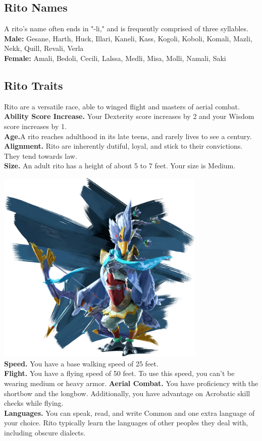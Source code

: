 \documentclass[10pt,twoside,twocolumn,openany]{book}
\begin{document}
\subsection{Rito Names}
A rito's name often ends in "-li," and is frequently comprised of three syllables.\\
\textbf{Male:} Gesane, Harth, Huck, Illari, Kaneli, Kass, Kogoli, Koboli, Komali, Mazli, Nekk, Quill, Revali, Verla\\
\textbf{Female:} Amali, Bedoli, Cecili, Lalssa, Medli, Misa, Molli, Namali, Saki

\subsection{Rito Traits}
Rito are a versatile race, able to winged flight and masters of aerial combat.\\
\indent \textbf{Ability Score Increase.} Your Dexterity score increases by 2 and your Wisdom score increases by 1.\\
\indent \textbf{Age.}A rito reaches adulthood in its late teens, and rarely lives to see a century.\\
\indent \textbf{Alignment.} Rito are inherently dutiful, loyal, and stick to their convictions. They tend towards law. \\
\indent \textbf{Size.} An adult rito has a height of about 5 to 7 feet. Your size is Medium.

\includegraphics[width=100mm,scale=0.5]{revali.png} \\

\indent \textbf{Speed.} You have a base walking speed of 25 feet.\\
\indent \textbf{Flight.} You have a flying speed of 50 feet. To use this
speed, you can’t be wearing medium or heavy armor.
\indent \textbf{Aerial Combat.} You have proficiency with the shortbow and the longbow. Additionally, you have advantage on Acrobatic skill checks while flying.\\
\indent \textbf{Languages.} You can speak, read, and write Common and one extra language of your choice. Rito typically learn the languages of other peoples they deal with, including obscure dialects.
\end{document}
